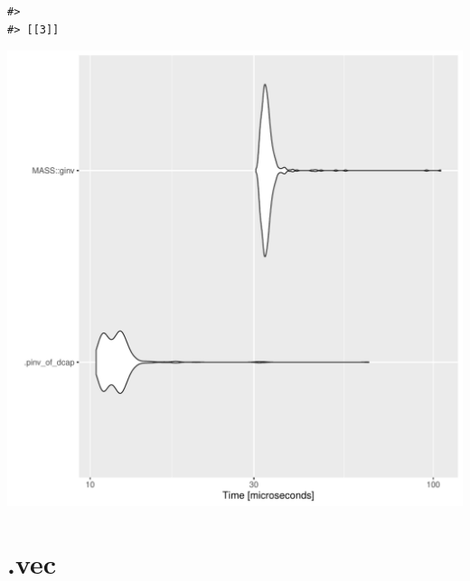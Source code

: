 \documentclass{article}\usepackage[]{graphicx}\usepackage[]{color}
\makeatletter
\newenvironment{kframe}{%
 \def\at@end@of@kframe{}%
 \ifinner\ifhmode%
  \def\at@end@of@kframe{\end{minipage}}%
  \begin{minipage}{\columnwidth}%
 \fi\fi%
 \def\FrameCommand##1{\hskip\@totalleftmargin \hskip-\fboxsep
 \colorbox{shadecolor}{##1}\hskip-\fboxsep
     \hskip-\linewidth \hskip-\@totalleftmargin \hskip\columnwidth}%
 \MakeFramed {\advance\hsize-\width
   \@totalleftmargin\z@ \linewidth\hsize
   \@setminipage}}%
 {\par\unskip\endMakeFramed%
 \at@end@of@kframe}
\newenvironment{knitrout}{}{} %
\makeatother
\begin{document}
\begin{knitrout}
\begin{kframe}\begin{verbatim}
#> 
#> [[3]]
\end{verbatim}
\end{kframe}
\includegraphics[width=1\linewidth]{man/figures/latex-test-benchmark-linearAlgebra-pinv-of-dcap-dot-3} 

\end{knitrout}

\newpage

\section{.vec}
\end{document}
